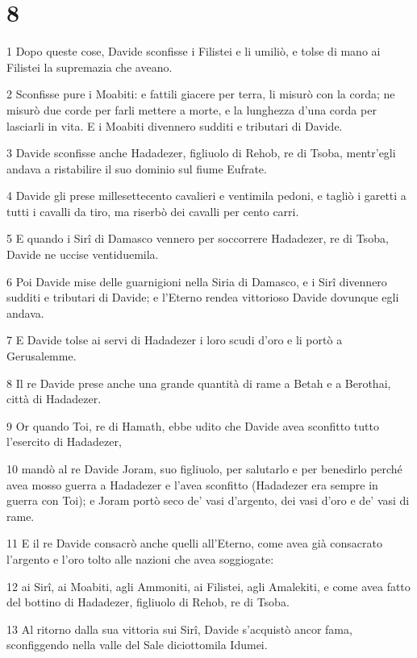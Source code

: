 \chapter{8}

\par 1 Dopo queste cose, Davide sconfisse i Filistei e li umiliò, e tolse di mano ai Filistei la supremazia che aveano.
\par 2 Sconfisse pure i Moabiti: e fattili giacere per terra, li misurò con la corda; ne misurò due corde per farli mettere a morte, e la lunghezza d'una corda per lasciarli in vita. E i Moabiti divennero sudditi e tributari di Davide.
\par 3 Davide sconfisse anche Hadadezer, figliuolo di Rehob, re di Tsoba, mentr'egli andava a ristabilire il suo dominio sul fiume Eufrate.
\par 4 Davide gli prese millesettecento cavalieri e ventimila pedoni, e tagliò i garetti a tutti i cavalli da tiro, ma riserbò dei cavalli per cento carri.
\par 5 E quando i Sirî di Damasco vennero per soccorrere Hadadezer, re di Tsoba, Davide ne uccise ventiduemila.
\par 6 Poi Davide mise delle guarnigioni nella Siria di Damasco, e i Sirî divennero sudditi e tributari di Davide; e l'Eterno rendea vittorioso Davide dovunque egli andava.
\par 7 E Davide tolse ai servi di Hadadezer i loro scudi d'oro e li portò a Gerusalemme.
\par 8 Il re Davide prese anche una grande quantità di rame a Betah e a Berothai, città di Hadadezer.
\par 9 Or quando Toi, re di Hamath, ebbe udito che Davide avea sconfitto tutto l'esercito di Hadadezer,
\par 10 mandò al re Davide Joram, suo figliuolo, per salutarlo e per benedirlo perché avea mosso guerra a Hadadezer e l'avea sconfitto (Hadadezer era sempre in guerra con Toi); e Joram portò seco de' vasi d'argento, dei vasi d'oro e de' vasi di rame.
\par 11 E il re Davide consacrò anche quelli all'Eterno, come avea già consacrato l'argento e l'oro tolto alle nazioni che avea soggiogate:
\par 12 ai Sirî, ai Moabiti, agli Ammoniti, ai Filistei, agli Amalekiti, e come avea fatto del bottino di Hadadezer, figliuolo di Rehob, re di Tsoba.
\par 13 Al ritorno dalla sua vittoria sui Sirî, Davide s'acquistò ancor fama, sconfiggendo nella valle del Sale diciottomila Idumei.
